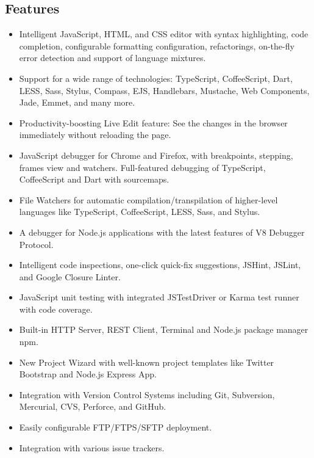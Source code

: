 \subsection{Features}
\begin{itemize}
\item Intelligent JavaScript, HTML, and CSS editor with syntax highlighting, code completion, configurable formatting configuration, refactorings, on-the-fly error detection and support of language mixtures.
\item Support for a wide range of technologies: TypeScript, CoffeeScript, Dart, LESS, Sass, Stylus, Compass, EJS, Handlebars, Mustache, Web Components, Jade, Emmet, and many more.
\item Productivity-boosting Live Edit feature: See the changes in the browser immediately without reloading the page.
\item 
JavaScript debugger for Chrome and Firefox, with breakpoints, stepping, frames view and watchers. Full-featured debugging of TypeScript, CoffeeScript and Dart with sourcemaps.
\item 
File Watchers for automatic compilation/transpilation of higher-level languages like TypeScript, CoffeeScript, LESS, Sass, and Stylus.
\item 
A debugger for Node.js applications with the latest features of V8 Debugger Protocol.
\item 
Intelligent code inspections, one-click quick-fix suggestions, JSHint, JSLint, and Google Closure Linter.
\item
JavaScript unit testing with integrated JSTestDriver or Karma test runner with code coverage. 
\item
Built-in HTTP Server, REST Client, Terminal and Node.js package manager npm. 
\item 
New Project Wizard with well-known project templates like Twitter Bootstrap and Node.js Express App.
\item
Integration with Version Control Systems including Git, Subversion, Mercurial, CVS, Perforce, and GitHub. 
\item 
Easily configurable FTP/FTPS/SFTP deployment.
\item 
Integration with various issue trackers.
\end{itemize}
















